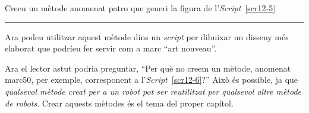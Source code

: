 \begin{center}
\colorbox{black}{}
\end{center}
{\small
\noindent
Creeu un mètode anomenat \textsf{patro} que generi la figura de l'\emph{Script}~\ref{scr12-5}}\\
\noindent
\rule{\textwidth}{3pt}
\vspace*{2mm}

Ara podeu utilitzar aquest mètode dins un \emph{script} per dibuixar un disseny més elaborat que podríeu fer servir com a marc ``art nouveau''.

Ara el lector astut podria preguntar, ``Per què no creem un mètode, anomenat \textsf{marc50}, per exemple, corresponent a l'\emph{Script}~\ref{scr12-6}?'' Això és possible, ja que \emph{qualsevol mètode creat per a un robot pot ser reutilitzat per qualsevol altre mètode de robots}. Crear aquests mètodes és el tema del proper capítol. 

